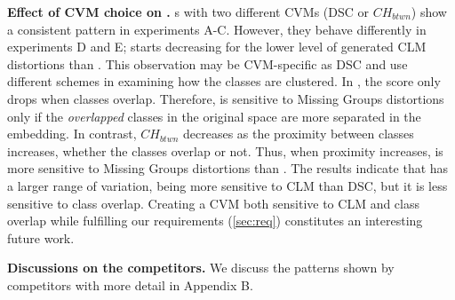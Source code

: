 \noindent
\textbf{Effect of CVM choice on \ltc.}
\ltc{}s with two different CVMs (DSC or $CH_{btwn}$) show a consistent pattern in experiments A-C. However, they behave differently in experiments D and E; 
\lc [$CH_{btwn}$] starts decreasing for the lower level of generated CLM distortions than \lc [DSC]. This observation may be CVM-specific as DSC and \CHb use different schemes in examining how the classes are clustered. 
In \lc [DSC], the score only drops when classes overlap. 
Therefore, \lc [DSC]  is sensitive to Missing Groups distortions only if the \textit{overlapped} classes in the original space are more separated in the embedding. 
In contrast, $CH_{btwn}$ decreases as the proximity between classes increases, whether the classes overlap or not. Thus, when proximity increases, \lc [\CHb{}]  is more sensitive to Missing Groups distortions than \lc [DSC].
The results indicate that \CHb has a larger range of variation, being more sensitive to CLM than DSC, but it is less sensitive to class overlap. %
Creating a CVM both sensitive to CLM and class overlap while fulfilling our requirements (\autoref{sec:req}) constitutes an interesting future work. 




\noindent
\textbf{Discussions on the competitors.}
We discuss the patterns shown by competitors with more detail in Appendix B.


